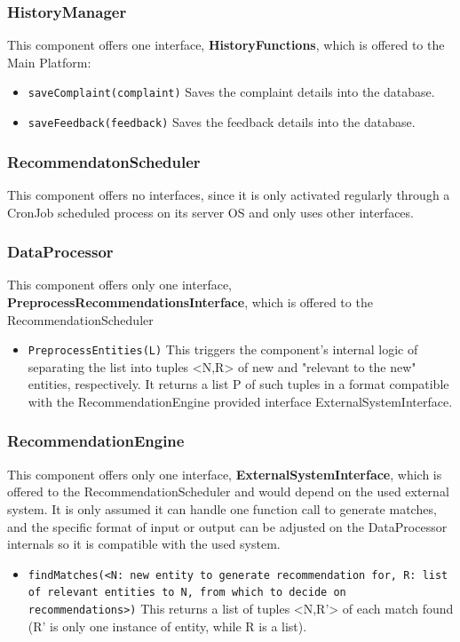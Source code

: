 \subsubsection{HistoryManager} 

This component offers one interface, \textbf{HistoryFunctions}, which is offered to the Main Platform:
\begin{itemize}
    \item \texttt{saveComplaint(complaint)} Saves the complaint details into the database.
    \item \texttt{saveFeedback(feedback)} Saves the feedback details into the database.
\end{itemize}


\subsubsection{RecommendatonScheduler} 

This component offers no interfaces, since it is only activated regularly through a CronJob scheduled process on its server OS and only uses other interfaces.


\subsubsection{DataProcessor} 

This component offers only one interface, \textbf{PreprocessRecommendationsInterface}, which is offered to the RecommendationScheduler
\begin{itemize}
    \item \texttt{PreprocessEntities(L)} This triggers the component's internal logic of separating the list into tuples <N,R> of new and "relevant to the new" entities, respectively. It returns a list P of such tuples in a format compatible with the RecommendationEngine provided interface ExternalSystemInterface.
\end{itemize}

\subsubsection{RecommendationEngine} 

This component offers only one interface, \textbf{ExternalSystemInterface}, which is offered to the RecommendationScheduler and would depend on the used external system. It is only assumed it can handle one function call to generate matches, and the specific format of input or output can be adjusted on the DataProcessor internals so it is compatible with the used system.
\begin{itemize}
    \item \texttt{findMatches(<N: new entity to generate recommendation for, R: list of relevant entities to N, from which to decide on recommendations>)} This returns a list of tuples <N,R'> of each match found (R' is only one instance of entity, while R is a list).
\end{itemize}


